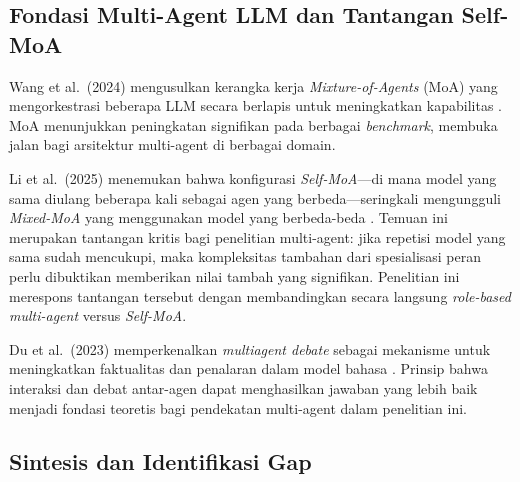 \subsection{Fondasi Multi-Agent LLM dan Tantangan Self-MoA}

Wang et al.\ (2024) mengusulkan kerangka kerja \textit{Mixture-of-Agents} (MoA) yang mengorkestrasi beberapa LLM secara berlapis untuk meningkatkan kapabilitas \cite{wang2024moa}. MoA menunjukkan peningkatan signifikan pada berbagai \textit{benchmark}, membuka jalan bagi arsitektur multi-agent di berbagai domain.

Li et al.\ (2025) menemukan bahwa konfigurasi \textit{Self-MoA}—di mana model yang sama diulang beberapa kali sebagai agen yang berbeda—seringkali mengungguli \textit{Mixed-MoA} yang menggunakan model yang berbeda-beda \cite{lismoa2025}. Temuan ini merupakan tantangan kritis bagi penelitian multi-agent: jika repetisi model yang sama sudah mencukupi, maka kompleksitas tambahan dari spesialisasi peran perlu dibuktikan memberikan nilai tambah yang signifikan. Penelitian ini merespons tantangan tersebut dengan membandingkan secara langsung \textit{role-based multi-agent} versus \textit{Self-MoA}.

Du et al.\ (2023) memperkenalkan \textit{multiagent debate} sebagai mekanisme untuk meningkatkan faktualitas dan penalaran dalam model bahasa \cite{du2023}. Prinsip bahwa interaksi dan debat antar-agen dapat menghasilkan jawaban yang lebih baik menjadi fondasi teoretis bagi pendekatan multi-agent dalam penelitian ini.

\subsection{Sintesis dan Identifikasi Gap}

